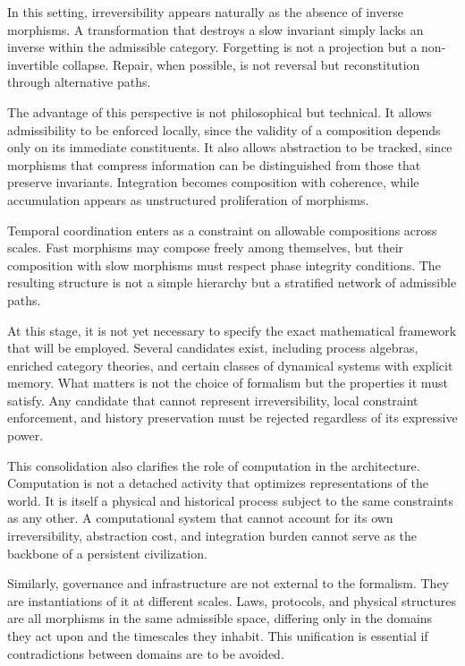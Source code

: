 \documentclass[12pt,oneside]{book}
\begin{document}
In this setting, irreversibility appears naturally as the absence of inverse morphisms. A transformation that destroys a slow invariant simply lacks an inverse within the admissible category. Forgetting is not a projection but a non-invertible collapse. Repair, when possible, is not reversal but reconstitution through alternative paths.

The advantage of this perspective is not philosophical but technical. It allows admissibility to be enforced locally, since the validity of a composition depends only on its immediate constituents. It also allows abstraction to be tracked, since morphisms that compress information can be distinguished from those that preserve invariants. Integration becomes composition with coherence, while accumulation appears as unstructured proliferation of morphisms.

Temporal coordination enters as a constraint on allowable compositions across scales. Fast morphisms may compose freely among themselves, but their composition with slow morphisms must respect phase integrity conditions. The resulting structure is not a simple hierarchy but a stratified network of admissible paths.

At this stage, it is not yet necessary to specify the exact mathematical framework that will be employed. Several candidates exist, including process algebras, enriched category theories, and certain classes of dynamical systems with explicit memory. What matters is not the choice of formalism but the properties it must satisfy. Any candidate that cannot represent irreversibility, local constraint enforcement, and history preservation must be rejected regardless of its expressive power.

This consolidation also clarifies the role of computation in the architecture. Computation is not a detached activity that optimizes representations of the world. It is itself a physical and historical process subject to the same constraints as any other. A computational system that cannot account for its own irreversibility, abstraction cost, and integration burden cannot serve as the backbone of a persistent civilization.

Similarly, governance and infrastructure are not external to the formalism. They are instantiations of it at different scales. Laws, protocols, and physical structures are all morphisms in the same admissible space, differing only in the domains they act upon and the timescales they inhabit. This unification is essential if contradictions between domains are to be avoided.
\end{document}
